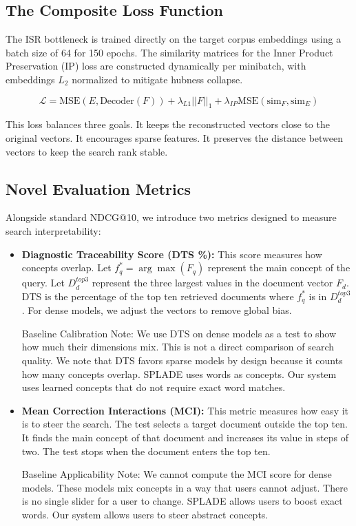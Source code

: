 \documentclass[sigconf,anonymous,screen]{acmart}
\begin{document}
\subsection{The Composite Loss Function}
\vspace{-2pt}
The ISR bottleneck is trained directly on the target corpus embeddings using a batch size of 64 for 150 epochs. The similarity matrices for the Inner Product Preservation (IP) loss are constructed dynamically per minibatch, with embeddings $L_2$ normalized to mitigate hubness collapse.

\begin{equation}
\mathcal{L} = \text{MSE}(E, \text{Decoder}(F)) + \lambda_{L1} ||F||_1 + \lambda_{IP} \text{MSE}(\text{sim}_F, \text{sim}_E)
\end{equation}

This loss balances three goals. It keeps the reconstructed vectors close to the original vectors. It encourages sparse features. It preserves the distance between vectors to keep the search rank stable.

\subsection{Novel Evaluation Metrics}
\vspace{-2pt}
Alongside standard NDCG@10, we introduce two metrics designed to measure search interpretability:

\begin{itemize}\setlength{\itemsep}{1pt}\setlength{\parskip}{0pt}\setlength{\parsep}{0pt}\setlength{\topsep}{0pt}\setlength{\partopsep}{0pt}
    \item \textbf{Diagnostic Traceability Score (DTS \%):} This score measures how concepts overlap. Let $f_q^* = \arg\max(F_q)$ represent the main concept of the query. Let $D_d^{top3}$ represent the three largest values in the document vector $F_d$. DTS is the percentage of the top ten retrieved documents where $f_q^*$ is in $D_d^{top3}$. For dense models, we adjust the vectors to remove global bias. 
    
    Baseline Calibration Note: We use DTS on dense models as a test to show how much their dimensions mix. This is not a direct comparison of search quality. We note that DTS favors sparse models by design because it counts how many concepts overlap. SPLADE uses words as concepts. Our system uses learned concepts that do not require exact word matches.
    
    \item \textbf{Mean Correction Interactions (MCI):} This metric measures how easy it is to steer the search. The test selects a target document outside the top ten. It finds the main concept of that document and increases its value in steps of two. The test stops when the document enters the top ten. 
    
    Baseline Applicability Note: We cannot compute the MCI score for dense models. These models mix concepts in a way that users cannot adjust. There is no single slider for a user to change. SPLADE allows users to boost exact words. Our system allows users to steer abstract concepts.
\end{itemize}
\end{document}
